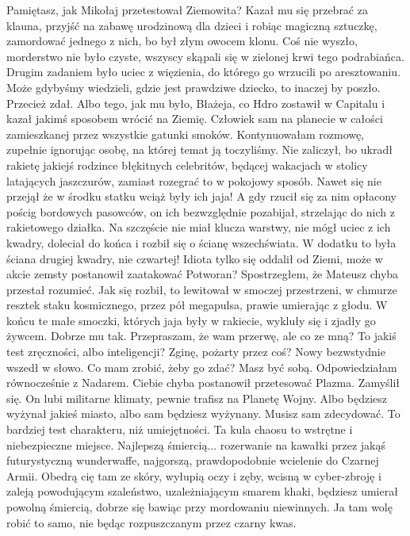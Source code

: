 \begin{dialogue}
Pamiętasz, jak Mikołaj przetestował Ziemowita? Kazał mu się przebrać za klauna, przyjść na zabawę urodzinową dla dzieci i robiąc magiczną sztuczkę, zamordować jednego z nich, bo był złym owocem klonu.
Coś nie wyszło, morderstwo nie było czyste, wszyscy skąpali się w zielonej krwi tego podrabiańca.
Drugim zadaniem było uciec z więzienia, do którego go wrzucili po aresztowaniu. Może gdybyśmy wiedzieli, gdzie jest prawdziwe dziecko, to inaczej by poszło.
\ds{} Przecież zdał.
\ds{} Albo tego, jak mu było, Błażeja, co Hdro zostawił w Capitalu i kazał jakimś sposobem wrócić na Ziemię.
Człowiek sam na planecie w całości zamieszkanej przez wszystkie gatunki smoków.
\dm{} Kontynuowałam rozmowę, zupełnie ignorując osobę, na której temat ją toczyliśmy.
\ds{} Nie zaliczył, bo ukradł rakietę jakiejś rodzince błękitnych celebritów, będącej wakacjach w stolicy latających jaszczurów, zamiast rozegrać to w pokojowy sposób. 
Nawet się nie przejął że w środku statku wciąż były ich jaja!
A gdy rzucił się za nim opłacony pościg bordowych pasowców, on ich bezwzględnie pozabijał, strzelając do nich z rakietowego działka.
Na szczęście nie miał klucza warstwy, nie mógł uciec z ich kwadry, doleciał do końca i rozbił się o ścianę wszechświata. 
W dodatku to była ściana drugiej kwadry, nie czwartej! 
Idiota tylko się oddalił od Ziemi, może w akcie zemsty postanowił zaatakować Potworan?
\dm{} Spostrzegłem, że Mateusz chyba przestał rozumieć. \dm{}
Jak się rozbił, to lewitował w smoczej przestrzeni, w chmurze resztek staku kosmicznego, przez pół megapulsa, prawie umierając z głodu.
W końcu te małe smoczki, których jaja były w rakiecie, wykluły się i zjadły go żywcem.
Dobrze mu tak.
\ds{} Przepraszam, że wam przerwę, ale co ze mną? To jakiś test zręczności, albo inteligencji? 
Zginę, pożarty przez coś? \dm{} Nowy bezwstydnie wszedł w słowo. \dm{} Co mam zrobić, żeby go zdać?
\ds{} Masz być sobą. \dm{} Odpowiedziałam równocześnie z Nadarem.
\ds{} Ciebie chyba postanowił przetesować Plazma. \dm{} Zamyślił się. \dm{} On lubi militarne klimaty, pewnie trafisz na Planetę Wojny.
Albo będziesz wyżynał jakieś miasto, albo sam będziesz wyżynany. Musisz sam zdecydować.
To bardziej test charakteru, niż umiejętności. Ta kula chaosu to wstrętne i niebezpieczne miejsce.
Najlepszą śmiercią... rozerwanie na kawałki przez jakąś futurystyczną wunderwaffe, najgorszą, prawdopodobnie wcielenie do Czarnej Armii.
Obedrą cię tam ze skóry, wyłupią oczy i zęby, wcisną w cyber-zbroję i zaleją powodującym szaleństwo, uzależniającym smarem khaki, 
będziesz umierał powolną śmiercią, dobrze się bawiąc przy mordowaniu niewinnych. 
Ja tam wolę robić to samo, nie będąc rozpuszczanym przez czarny kwas.
\end{dialogue}


